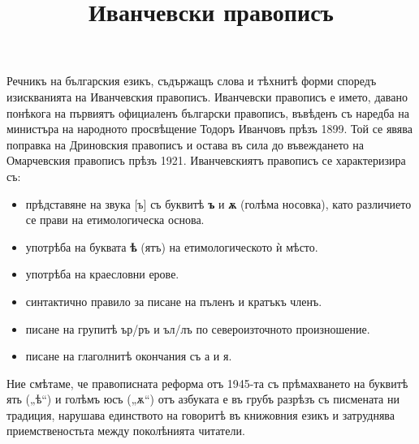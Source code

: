 \documentclass{article}
\begin{document}
	\title{Иванчевски правописъ}
	\maketitle
	
	Речникъ на българския езикъ, съдържащъ слова и тѣхнитѣ форми споредъ изискванията на Иванчевския правописъ. 
	Иванчевски правописъ е името, давано понѣкога на първиятъ официаленъ български правописъ, 
	въвѣденъ съ наредба на министъра на народното просвѣщение Тодоръ Иванчовъ прѣзъ 1899.
 	Той се явява поправка на Дриновския правописъ и остава въ сила до въвеждането на Омарчевския правописъ прѣзъ 1921. 
 	Иванчевскиятъ правописъ се характеризира съ:
 	\begin{itemize}
 		\item прѣдставяне на звука [ъ] съ буквитѣ \textbf{ъ} и \textbf{ѫ} (голѣма носовка), като различието се прави на етимологическа основа.
 		\item употрѣба на буквата \textbf{ѣ} (ятъ) на етимологическото ѝ мѣсто.
 		\item употрѣба на краесловни ерове.
 		\item синтактично правило за писане на пъленъ и кратъкъ членъ.
 		\item писане на групитѣ ър/ръ и ъл/лъ по североизточното произношение.
 		\item писане на глаголнитѣ окончания съ а и я.
 	\end{itemize}
    
    
    Ние смѣтаме, че правописната реформа отъ 1945-та съ прѣмахването на буквитѣ ять („ѣ“) и голѣмъ юсъ („ѫ“) отъ азбуката е въ грубъ разрѣзъ съ писмената ни традиция, нарушава единството на говоритѣ въ книжовния езикъ и затруднява приемственостьта между поколѣнията читатели.
 
\end{document}
